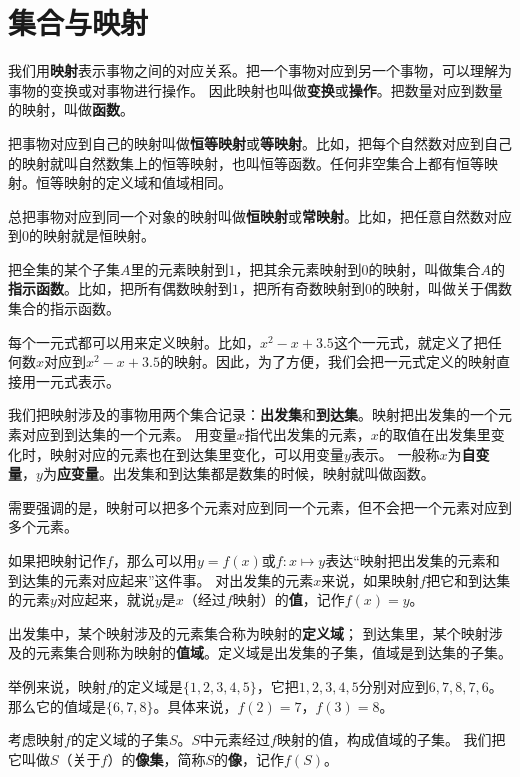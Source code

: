 \documentclass[12pt,UTF8,fontset=none]{ctexbook}
\begin{document}
\section{集合与映射}

我们用\textbf{映射}表示事物之间的对应关系。把一个事物对应到另一个事物，可以理解为事物的变换或对事物进行操作。
因此映射也叫做\textbf{变换}或\textbf{操作}。把数量对应到数量的映射，叫做\textbf{函数}。

把事物对应到自己的映射叫做\textbf{恒等映射}或\textbf{等映射}。比如，把每个自然数对应到自己的映射就叫自然数集上的恒等映射，也叫恒等函数。任何非空集合上都有恒等映射。恒等映射的定义域和值域相同。

总把事物对应到同一个对象的映射叫做\textbf{恒映射}或\textbf{常映射}。比如，把任意自然数对应到$0$的映射就是恒映射。

把全集的某个子集$A$里的元素映射到$1$，把其余元素映射到$0$的映射，叫做集合$A$的\textbf{指示函数}。比如，把所有偶数映射到$1$，把所有奇数映射到$0$的映射，叫做关于偶数集合的指示函数。

每个一元式都可以用来定义映射。比如，$x^2 - x + 3.5$这个一元式，就定义了把任何数$x$对应到$x^2 - x + 3.5$的映射。因此，为了方便，我们会把一元式定义的映射直接用一元式表示。

我们把映射涉及的事物用两个集合记录：\textbf{出发集}和\textbf{到达集}。映射把出发集的一个元素对应到到达集的一个元素。
用变量$x$指代出发集的元素，$x$的取值在出发集里变化时，映射对应的元素也在到达集里变化，可以用变量$y$表示。
一般称$x$为\textbf{自变量}，$y$为\textbf{应变量}。出发集和到达集都是数集的时候，映射就叫做函数。

需要强调的是，映射可以把多个元素对应到同一个元素，但不会把一个元素对应到多个元素。

如果把映射记作$f$，那么可以用$y = f(x)$或$f:x\mapsto y$表达“映射把出发集的元素和到达集的元素对应起来”这件事。
对出发集的元素$x$来说，如果映射$f$把它和到达集的元素$y$对应起来，就说$y$是$x$（经过$f$映射）的\textbf{值}，记作$f(x) = y$。

出发集中，某个映射涉及的元素集合称为映射的\textbf{定义域}；
到达集里，某个映射涉及的元素集合则称为映射的\textbf{值域}。定义域是出发集的子集，值域是到达集的子集。

举例来说，映射$f$的定义域是$\{1,2,3,4,5\}$，它把$1,2,3,4,5$分别对应到$6,7,8,7,6$。
那么它的值域是$\{6,7,8\}$。具体来说，$f(2) = 7$，$f(3) = 8$。

考虑映射$f$的定义域的子集$S$。$S$中元素经过$f$映射的值，构成值域的子集。
我们把它叫做$S$（关于$f$）的\textbf{像集}，简称$S$的\textbf{像}，记作$f(S)$。
\end{document}
